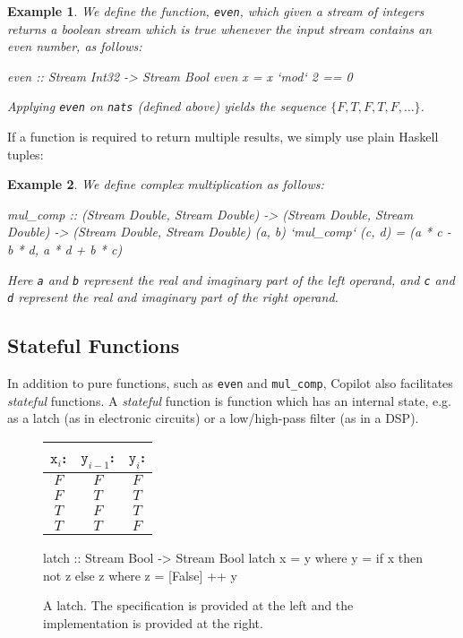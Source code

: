 \documentclass[]{article}
\theoremstyle{example}
\newtheorem{example}{Example}
\begin{document}
\begin{example}
We define the function, {\tt even}, which given a stream of
integers returns a boolean stream which is true whenever the input stream
contains an even number, as follows:
%
\begin{code}
even :: Stream Int32 -> Stream Bool
even x = x `mod` 2 == 0
\end{code}
%
Applying {\tt even} on {\tt nats} (defined above) yields the sequence
$\{F, T, F, T, F, \dots\}$.
\end{example}

If a function is required to return multiple results, we simply use plain
Haskell tuples:

\begin{example}
We define complex multiplication as follows:
%
\begin{code}
mul_comp
  :: (Stream Double, Stream Double)
  -> (Stream Double, Stream Double)
  -> (Stream Double, Stream Double)
(a, b) `mul_comp` (c, d) = (a * c - b * d, a * d + b * c)
\end{code}
%
Here {\tt a} and {\tt b} represent the real and imaginary part of the left
operand, and {\tt c} and {\tt d} represent the real and imaginary part
of the right operand.
\end{example}

\subsection{Stateful Functions}

In addition to pure functions, such as {\tt even} and {\tt mul\_comp},
Copilot also facilitates \emph{stateful} functions. A \emph{stateful} function
is function which has an internal state, e.g. as a latch (as in electronic
circuits) or a low/high-pass filter (as in a DSP).

\begin{figure}
\begin{minipage}{0.4\linewidth}
\begin{tabular}{c|c||c}
$\mathtt{x}_i$: & $\mathtt{y}_{i-1}$: & $\mathtt{y}_i$:\\
\hline
$F$ & $F$ & $F$ \\
\hline
$F$ & $T$ & $T$ \\
\hline
$T$ & $F$ & $T$ \\
\hline
$T$ & $T$ & $F$
\end{tabular}
\end{minipage}
\hspace{1cm}
\begin{minipage}{0.6\linewidth}
\begin{code}
latch :: Stream Bool -> Stream Bool
latch x = y
  where
    y = if x then not z else z
      where
        z = [False] ++ y
\end{code}
\end{minipage}
\caption{A latch. The specification is provided at the left and the
implementation is provided at the right.}
\label{fig:jk_latch}
\end{figure}
\end{document}
